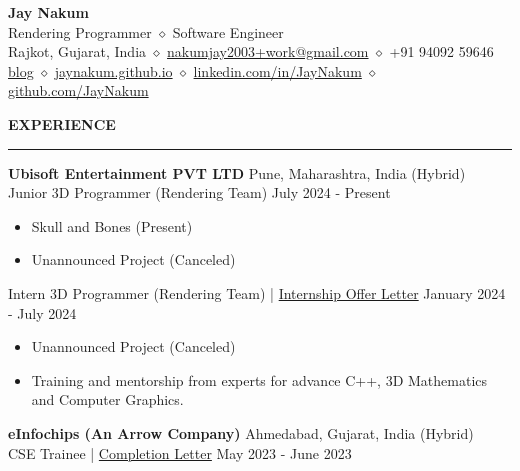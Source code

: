 \documentclass[a4paper, 11pt]{article}
\newenvironment{resumeSection}[1]
{
    \MakeUppercase{\Large\textbf{#1}}
    \medskip
    \hrule
    \begin{list}{}
    {
        \setlength\itemsep{-0.3em}
        \setlength\leftmargin{0em}
    }
    \vspace{-1em}
    \item[]
}
{   \end{list}  }
\newenvironment{sectionItems}
{
    \vspace{-0.5em}
    \begin{itemize}
    \setlength{\itemsep}{-0.7em}
}
{
    \end{itemize}
}
\begin{document}
\begin{center}
    {\huge \textbf{Jay Nakum} }
    \\
    \smallskip 
    {\large Rendering Programmer $\diamond$ Software Engineer}
    \\
    Rajkot, Gujarat, India
    $\diamond$
    \href{mailto:nakumjay2003+work@gmail.com}{nakumjay2003+work@gmail.com}
    $\diamond$
    +91 94092 59646
    \\
    \href{https://jaynakum.github.io/blog}{blog}
    $\diamond$
    \href{https://jaynakum.github.io}{jaynakum.github.io}
    $\diamond$
    \href{https://linkedin.com/in/JayNakum}{linkedin.com/in/JayNakum}
    $\diamond$
    \href{https://github.com/JayNakum}{github.com/JayNakum}
\end{center}  

\medskip
\begin{resumeSection}{Experience}
    \item
    \textbf{Ubisoft Entertainment PVT LTD}
    \hfill
    Pune, Maharashtra, India (Hybrid)
    \\
    Junior 3D Programmer (Rendering Team)
    \hfill
    July 2024 - Present
    
    \begin{sectionItems}
        \item Skull and Bones (Present)
        \item Unannounced Project (Canceled)
    \end{sectionItems}
    
    \item
    Intern 3D Programmer (Rendering Team) | \href{https://drive.google.com/file/d/14NAg0WCT8G1mMbb5nMeUtBY0cgDZIWZu/view?usp=sharing}{Internship Offer Letter}
    \hfill
    January 2024 - July 2024
    
    \begin{sectionItems}
        \item Unannounced Project (Canceled)
        \item Training and mentorship from experts for advance C++, 3D Mathematics and Computer Graphics.
    \end{sectionItems}
    
    \item
    \textbf{eInfochips (An Arrow Company)}
    \hfill
    Ahmedabad, Gujarat, India (Hybrid)
    \\
    CSE Trainee | \href{https://drive.google.com/file/d/1YWbPwVQkBEM7lSxONwVByMf6O-FGWlK7/view?usp=sharing}{Completion Letter}
    \hfill
    May 2023 - June 2023
    

\end{resumeSection}
\end{document}
